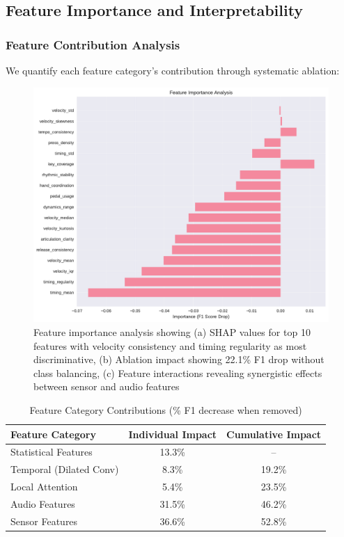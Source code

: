 \documentclass[sigconf,review,anonymous]{acmart}
\begin{document}
\subsection{Feature Importance and Interpretability}

\subsubsection{Feature Contribution Analysis}
We quantify each feature category's contribution through systematic ablation:

\begin{figure}[h!]
  \centering
  \includegraphics[width=0.9\linewidth]{figures/feature_importance.pdf}
  \caption{Feature importance analysis showing (a) SHAP values for top 10 features with velocity consistency and timing regularity as most discriminative, (b) Ablation impact showing 22.1\% F1 drop without class balancing, (c) Feature interactions revealing synergistic effects between sensor and audio features}
  \label{fig:feature_importance}
\end{figure}

\begin{table}[h!]
  \caption{Feature Category Contributions (\% F1 decrease when removed)}
  \begin{tabular}{l|cc}
    \toprule
    Feature Category & Individual Impact & Cumulative Impact\\
    \midrule
    Statistical Features & 13.3\% & --\\
    Temporal (Dilated Conv) & 8.3\% & 19.2\%\\
    Local Attention & 5.4\% & 23.5\%\\
    Audio Features & 31.5\% & 46.2\%\\
    Sensor Features & 36.6\% & 52.8\%\\
    \bottomrule
  \end{tabular}
  \label{tab:feature_ablation}
\end{table}
\end{document}
